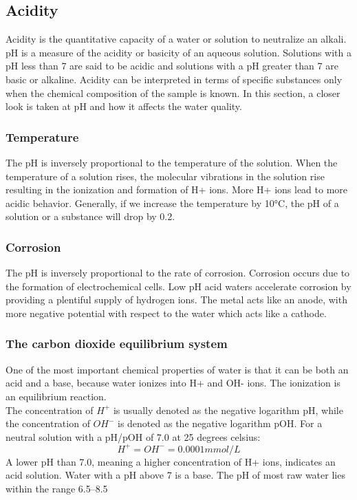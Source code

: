 \newpage
\subsection{Acidity} \label{acidity}
Acidity is the quantitative capacity of a water or solution to neutralize an alkali. pH is a measure of the acidity or basicity of an aqueous solution. Solutions with a pH less than 7 are said to be acidic and solutions with a pH greater than 7 are basic or alkaline. \cite{phmerriam} Acidity can be interpreted in terms of specific substances only when the chemical composition of the sample is known. In this section, a closer look is taken at pH and how it affects the water quality. 

\subsubsection{Temperature}
The pH is inversely proportional to the temperature of the solution. When the temperature of a solution rises, the molecular vibrations in the solution rise resulting in the ionization and formation of H+ ions. More H+ ions lead to more acidic behavior. Generally, if we increase the temperature by 10°C, the pH of a solution or a substance will drop by 0.2.  \cite{temperatureph}

\subsubsection{Corrosion}
The pH is inversely proportional to the rate of corrosion. Corrosion occurs due to the formation of electrochemical cells. Low pH acid waters accelerate corrosion by providing a plentiful supply of hydrogen ions. The metal acts like an anode, with more negative potential with respect to the water which acts like a cathode. \cite{standardmethods}

\subsubsection{The carbon dioxide equilibrium system}
One of the most important chemical properties of water is that it can be both an acid and a base, because water ionizes into H+ and OH- ions.
The ionization is an equilibrium reaction.\\
The concentration of $H^+$ is usually denoted as the negative logarithm pH, while the concentration of $OH^-$ is denoted as the negative logarithm pOH.
For a neutral solution with a pH/pOH of 7.0 at 25 degrees celsius:
\[H^+ = OH^- = 0.0001 mmol/L\]
A lower pH than 7.0, meaning a higher concentration of H+ ions, indicates an acid solution. Water with a pH above 7 is a base. The pH of most raw water lies within the range 6.5–8.5 \cite{standardmethods}\\

